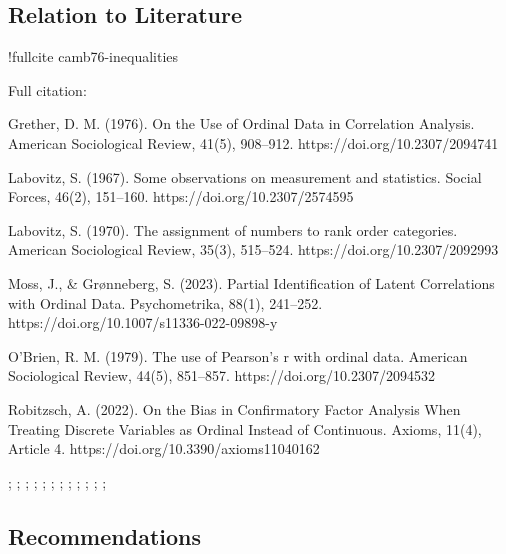 \documentclass[
  12pt,
]{article}
\theoremstyle{plain}
\theoremstyle{definition}
\theoremstyle{remark}
\begin{document}
\subsection{Relation to Literature}\label{relation-to-literature}

!fullcite camb76-inequalities

Full citation:

{\textcite{camb76-inequalities}}

Grether, D. M. (1976). On the Use of Ordinal Data in Correlation
Analysis. American Sociological Review, 41(5), 908--912.
https://doi.org/10.2307/2094741

Labovitz, S. (1967). Some observations on measurement and statistics.
Social Forces, 46(2), 151--160. https://doi.org/10.2307/2574595

Labovitz, S. (1970). The assignment of numbers to rank order categories.
American Sociological Review, 35(3), 515--524.
https://doi.org/10.2307/2092993

Moss, J., \& Grønneberg, S. (2023). Partial Identification of Latent
Correlations with Ordinal Data. Psychometrika, 88(1), 241--252.
https://doi.org/10.1007/s11336-022-09898-y

O'Brien, R. M. (1979). The use of Pearson's r with ordinal data.
American Sociological Review, 44(5), 851--857.
https://doi.org/10.2307/2094532

Robitzsch, A. (2022). On the Bias in Confirmatory Factor Analysis When
Treating Discrete Variables as Ordinal Instead of Continuous. Axioms,
11(4), Article 4. https://doi.org/10.3390/axioms11040162

\textcite{frec51-tableaux}

\textcite{whit76-bivariate}

\textcite{hoef40-masstabinvariante}

\textcite{lehm66-concepts}

\textcite{tche80-inequalities}

\textcite{camb76-inequalities}

\textcite{shih92-evaluating}

\textcite{alwi91-reliability}; \textcite{brew05-values};
\textcite{flor04-empirical}; \textcite{gait80-measurement};
\textcite{gree97-effect}; \textcite{jaco99-levels};
\textcite{kend38-new}; \textcite{knok02-statistics};
\textcite{kreu07-survey}; \textcite{kros97-designing};
\textcite{labo70-assignment}; \textcite{olss79-maximum};
\textcite{spea04-proof}

\subsection{Recommendations}\label{recommendations}
\end{document}
